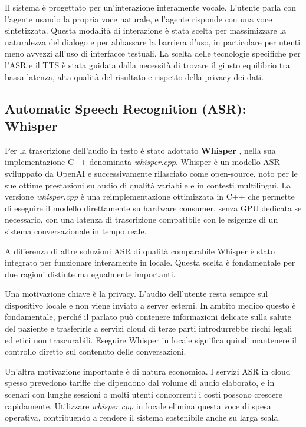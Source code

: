 Il sistema è progettato per un'interazione interamente vocale. L'utente parla con l'agente usando la propria voce naturale, e l'agente risponde con una voce sintetizzata. Questa modalità di interazione è stata scelta per massimizzare la naturalezza del dialogo e per abbassare la barriera d'uso, in particolare per utenti meno avvezzi all'uso di interfacce testuali. La scelta delle tecnologie specifiche per l'ASR e il TTS è stata guidata dalla necessità di trovare il giusto equilibrio tra bassa latenza, alta qualità del risultato e rispetto della privacy dei dati.

\subsection{Automatic Speech Recognition (ASR): Whisper}

Per la trascrizione dell'audio in testo è stato adottato \textbf{Whisper} \cite{whisper}, nella sua implementazione C++ denominata \textit{whisper.cpp}. Whisper è un modello ASR sviluppato da OpenAI e successivamente rilasciato come open-source, noto per le sue ottime prestazioni su audio di qualità variabile e in contesti multilingui. La versione \textit{whisper.cpp} è una reimplementazione ottimizzata in C++ che permette di eseguire il modello direttamente su hardware consumer, senza GPU dedicata se necessario, con una latenza di trascrizione compatibile con le esigenze di un sistema conversazionale in tempo reale.

A differenza di altre soluzioni ASR di qualità comparabile Whisper è stato integrato per funzionare interamente in locale. Questa scelta è fondamentale per due ragioni distinte ma egualmente importanti.

Una motivazione chiave è la privacy. L'audio dell'utente resta sempre sul dispositivo locale e non viene inviato a server esterni. In ambito medico questo è fondamentale, perché il parlato può contenere informazioni delicate sulla salute del paziente e trasferirle a servizi cloud di terze parti introdurrebbe rischi legali ed etici non trascurabili. Eseguire Whisper in locale significa quindi mantenere il controllo diretto sul contenuto delle conversazioni.

Un'altra motivazione importante è di natura economica. I servizi ASR in cloud spesso prevedono tariffe che dipendono dal volume di audio elaborato, e in scenari con lunghe sessioni o molti utenti concorrenti i costi possono crescere rapidamente. Utilizzare \textit{whisper.cpp} in locale elimina questa voce di spesa operativa, contribuendo a rendere il sistema sostenibile anche su larga scala.

